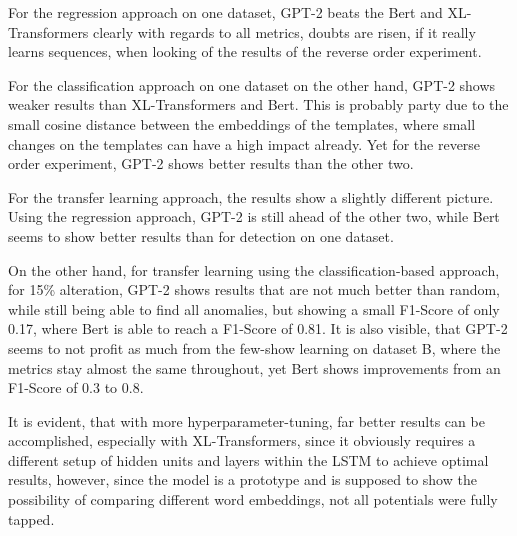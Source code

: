 \begin{comment}
For anomaly detection on one dataset using the regression approach, GPT-2 shows strong results, with F1-Scores of 0.95 when altering 5\% of log sequences, and 0.93 when altering the log lines, the quality of the results don't degrade much, when alteration ratios are increased, where Bert and XL-Transformers show decreases of 0.1 to 0.2 percentage points when increasing the alteration ratio from 5\% to 15\%. Yet, when the log events are completely reversed, GPT-2 achieves an F1-Score of only 0.55, where Bert and XL achieve 0.98, almost perfectly detecting the wrong sequence of log events.
\end{comment}

For the regression approach on one dataset, GPT-2 beats the Bert and XL-Transformers clearly with regards to all metrics, doubts are risen, if it really learns sequences, when looking of the results of the reverse order experiment.

For the classification approach on one dataset on the other hand, GPT-2   shows weaker results than XL-Transformers and Bert. This is probably party due to the small cosine distance between the embeddings of the templates, where small changes on the templates can have a high impact already. Yet for the reverse order experiment, GPT-2 shows better results than the other two.

For the transfer learning approach, the results show a slightly different picture. Using the regression approach, GPT-2 is still ahead of the other two, while Bert seems to show better results than for detection on one dataset. 

On the other hand, for transfer learning using the classification-based approach, for 15\% alteration, GPT-2 shows results that are not much better than random, while still being able to find all anomalies, but showing a small F1-Score of only 0.17, where Bert is able to reach a F1-Score of 0.81. It is also visible, that GPT-2 seems to not profit as much from the few-show learning on dataset B, where the metrics stay almost the same throughout, yet Bert shows improvements from an F1-Score of 0.3 to 0.8.

It is evident, that with more hyperparameter-tuning, far better results can be accomplished, especially with XL-Transformers, since it obviously requires a different setup of hidden units and layers within the LSTM to achieve optimal results, however, since the model is a prototype and is supposed to show the possibility of comparing different word embeddings, not all potentials were fully tapped.

